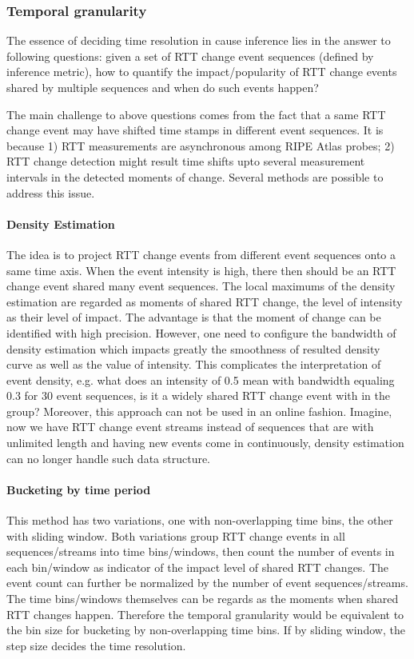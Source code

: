 \subsubsection{Temporal granularity}
The essence of deciding time resolution in cause inference lies in the answer to following questions: given a set of RTT change event sequences (defined by inference metric), how to quantify the impact/popularity of RTT change events shared by multiple sequences and when do such events happen?

The main challenge to above questions comes from the fact that a same RTT change event may have shifted time stamps in different event sequences. It is because 1) RTT measurements are asynchronous among RIPE Atlas probes; 2) RTT change detection might result time shifts upto several measurement intervals in the detected moments of change.
Several methods are possible to address this issue.


\paragraph{Density Estimation} The idea is to project RTT change events from different event sequences onto a same time axis. When the event intensity is high, there then should be an RTT change event shared many event sequences. The local maximums of the density estimation are regarded as moments of shared RTT change, the level of intensity  as their level of impact. The advantage is that the moment of change can be identified with high precision. However, one need to configure the bandwidth of density estimation which impacts greatly the smoothness of resulted density curve as well as the value of intensity. This complicates the interpretation of event density, e.g. what does an intensity of 0.5 mean with bandwidth equaling 0.3 for 30 event sequences, is it a widely shared RTT change event with in the group? Moreover, this approach can not be used in an online fashion. Imagine, now we have RTT change event streams instead of sequences that are with unlimited length and having new events come in continuously, density estimation can no longer handle such data structure.

\paragraph{Bucketing by time period} This method has two variations, one with non-overlapping time bins, the other with sliding window. Both variations group RTT change events in all sequences/streams into time bins/windows, then count the number of events in each bin/window as indicator of the impact level of shared RTT changes. The event count can further be normalized by the number of event sequences/streams. 
The time bins/windows themselves can be regards as the moments when shared RTT changes happen. Therefore the temporal granularity would be equivalent to the bin size for bucketing by non-overlapping time bins. If by sliding window, the step size decides the time resolution.

